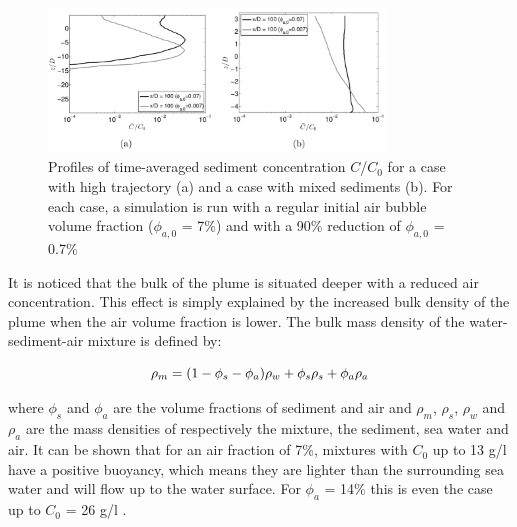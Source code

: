 \begin{figure}[ht!]
    \centering
    \includegraphics[width = 0.8\textwidth]{Images/air_belg.png}
    \caption{Profiles of time-averaged sediment concentration $C$/$C_0$ for a case with high trajectory (a) and a case with mixed sediments (b). For each case, a simulation is run with a regular initial air bubble volume fraction ($\phi_{a,0}$ = 7\%) and with a 90\% reduction of $\phi_{a,0}$ = 0.7\%}
    \label{fig:air_belg}
\end{figure}

\noindent It is noticed that the bulk of the plume is situated deeper with a reduced air concentration. This effect is simply explained by the increased bulk density of the plume when the air volume fraction is lower. The bulk mass density of the water-sediment-air mixture is defined by:

\begin{equation}
\centering
    \rho_m =  (1-\phi_s-\phi_a)\rho_w + \phi_s\rho_s + \phi_a\rho_a 
    \label{eq:bulk}    
\end{equation}

\noindent where $\phi_s$ and $\phi_a$ are the volume fractions of sediment and air and $\rho_m$, $\rho_s$, $\rho_w$ and $\rho_a$ are the mass densities of respectively the mixture, the sediment, sea water and air. It can be shown that for an air fraction of 7\%, mixtures with $C_0$ up to 13 g/l have a positive buoyancy, which means they are lighter than the surrounding sea water and will flow up to the water surface. For $\phi_a$ = 14\% this is even the case up to $C_0$ = 26 g/l \citep{Decrop}. \newline



